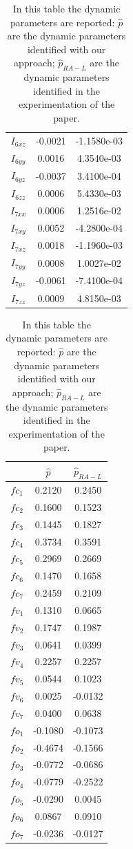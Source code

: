 \documentclass{article}
\begin{document}
\begin{table}
\begin{center}
\begin{tabular}{|c|cc|}
$ I_{6xz} $ & -0.0021 & -1.1580e-03\\
$ I_{6yy} $ & 0.0016 & 4.3540e-03\\
$ I_{6yz} $ & -0.0037 & 3.4100e-04\\
$ I_{6zz} $ & 0.0006 & 5.4330e-03\\
$ I_{7xx} $ & 0.0006 & 1.2516e-02\\
$ I_{7xy} $ & 0.0052 & -4.2800e-04\\
$ I_{7xz} $ & 0.0018 & -1.1960e-03\\
$ I_{7yy} $ & 0.0008 & 1.0027e-02\\
$ I_{7yz} $ & -0.0061 & -7.4100e-04\\
$ I_{7zz} $ & 0.0009 & 4.8150e-03\\
\hline
\end{tabular}
\hspace{1cm}
\begin{tabular}{|c|cc|}
\hline
& $\hat{p}$ & $\hat{p}_{RA-L}$\\ 
\hline
$ fc_1 $ & 0.2120 & 0.2450\\
$ fc_2 $ & 0.1600 & 0.1523\\
$ fc_3 $ & 0.1445 & 0.1827\\
$ fc_4 $ & 0.3734 & 0.3591\\
$ fc_5 $ & 0.2969 & 0.2669\\
$ fc_6 $ & 0.1470 & 0.1658\\
$ fc_7 $ & 0.2459 & 0.2109\\
$ fv_1 $ & 0.1310 & 0.0665\\
$ fv_2 $ & 0.1747 & 0.1987\\
$ fv_3 $ & 0.0641 & 0.0399\\
$ fv_4 $ & 0.2257 & 0.2257\\
$ fv_5 $ & 0.0544 & 0.1023\\
$ fv_6 $ & 0.0025 & -0.0132\\
$ fv_7 $ & 0.0400 & 0.0638\\
$ fo_1 $ & -0.1080 & -0.1073\\
$ fo_2 $ & -0.4674 & -0.1566\\
$ fo_3 $ & -0.0772 & -0.0686\\
$ fo_4 $ & -0.0779 & -0.2522\\
$ fo_5 $ & -0.0290 & 0.0045\\
$ fo_6 $ & 0.0867 & 0.0910\\
$ fo_7 $ & -0.0236 & -0.0127\\
\hline
\end{tabular}
\end{center}
\caption{In this table the dynamic parameters are reported: $\hat{p}$ are the dynamic parameters identified with our approach; $\hat{p}_{RA-L}$ are the dynamic parameters identified in the experimentation of the paper.}
\end{table}
\end{document}
